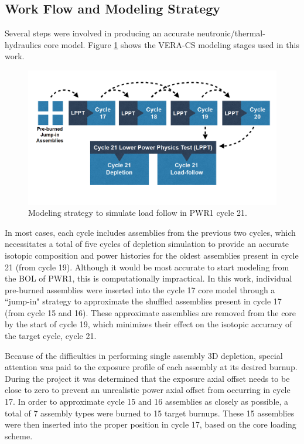 \documentclass[edeposit,fullpage,11pt]{uiucthesis2009}
\begin{document}
\subsection{Work Flow and Modeling Strategy}

Several steps were involved in producing an accurate neutronic/thermal-hydraulics core model. 
Figure \ref{fig:method} shows the VERA-CS modeling stages used in this work.


\begin{figure}
\begin{center}
\includegraphics[width=0.5\linewidth]{./Figures/method.png}
\end{center}
\caption{Modeling strategy to simulate load follow in PWR1 cycle 21.}
\label{fig:method}
\end{figure} 

In most cases, each cycle includes assemblies from the previous two cycles, which necessitates a total of five cycles of depletion simulation to provide an accurate isotopic composition and power histories for the oldest assemblies present in cycle 21 (from cycle 19). 
Although it would be most accurate to start modeling from the \gls{BOL} of PWR1, this is computationally impractical. 
In this work, individual pre-burned assemblies were inserted into the cycle 17 core model through a ``jump-in" strategy to approximate the shuffled assemblies present in cycle 17 (from cycle 15 and 16). 
These approximate assemblies are removed from the core by the start of cycle 19, which minimizes their effect on the isotopic accuracy of the target cycle, cycle 21. 

Because of the difficulties in performing single assembly 3D depletion, special attention was paid to the exposure profile of each assembly at its desired burnup. 
During the project it was determined that the exposure axial offset needs to be close to zero to prevent an unrealistic power axial offset from occurring in cycle 17. 
In order to approximate cycle 15 and 16 assemblies as closely as possible, a total of 7 assembly types were burned to 15 target burnups. 
These 15 assemblies were then inserted into the proper position in cycle 17, based on the core loading scheme.
\end{document}
